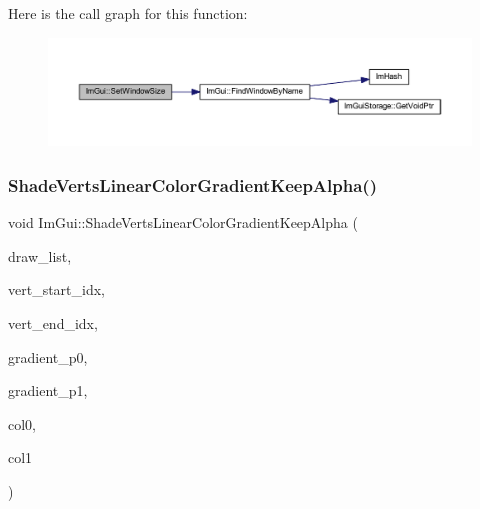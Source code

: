 Here is the call graph for this function\+:
\nopagebreak
\begin{figure}[H]
\begin{center}
\leavevmode
\includegraphics[width=350pt]{namespace_im_gui_a441528b9198d4531e79337121212cd33_cgraph}
\end{center}
\end{figure}
\mbox{\label{namespace_im_gui_acd137f6ee31f657e539eaa7e62f4f28a}} 
\subsubsection{\texorpdfstring{Shade\+Verts\+Linear\+Color\+Gradient\+Keep\+Alpha()}{ShadeVertsLinearColorGradientKeepAlpha()}}
{\footnotesize\ttfamily void Im\+Gui\+::\+Shade\+Verts\+Linear\+Color\+Gradient\+Keep\+Alpha (\begin{DoxyParamCaption}\item[{\mbox{\hyperlink{struct_im_draw_list}{Im\+Draw\+List}} $\ast$}]{draw\+\_\+list,  }\item[{int}]{vert\+\_\+start\+\_\+idx,  }\item[{int}]{vert\+\_\+end\+\_\+idx,  }\item[{\mbox{\hyperlink{struct_im_vec2}{Im\+Vec2}}}]{gradient\+\_\+p0,  }\item[{\mbox{\hyperlink{struct_im_vec2}{Im\+Vec2}}}]{gradient\+\_\+p1,  }\item[{\mbox{\hyperlink{imgui_8h_a118cff4eeb8d00e7d07ce3d6460eed36}{Im\+U32}}}]{col0,  }\item[{\mbox{\hyperlink{imgui_8h_a118cff4eeb8d00e7d07ce3d6460eed36}{Im\+U32}}}]{col1 }\end{DoxyParamCaption})}

\mbox{\label{namespace_im_gui_a676637659ec4291b07f386454840b58a}} 
